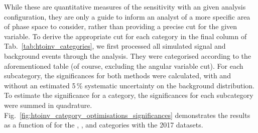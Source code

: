 While these are quantitative measures of the sensitivity with an given analysis configuration, they are only a guide to inform an analyst of a more specific area of phase space to consider, rather than providing a precise cut for the given variable. To derive the appropriate cut for each category in the final column of Tab.~\ref{tab:htoinv_categories}, we first processed all simulated signal and background events through the analysis. They were categorised according to the aforementioned table (of course, excluding the angular variable cut). For each subcategory, the significances for both methods were calculated, with and without an estimated 5\,\% systematic uncertainty on the background distribution. To estimate the significance for a category, the significances for each subcategory were summed in quadrature. Fig.~\ref{fig:htoinv_category_optimisations_significances} demonstrates the results as a function of \omegaTilde for the \ttH, \VH, and \ggH categories with the 2017 datasets.

